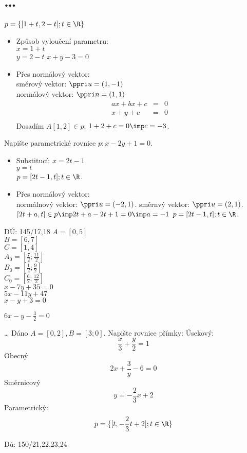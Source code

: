 
\let\braceru=\relax \let\bracelu=\relax 
\def\o#1{\setbox0=
	\hbox{$\kern2pt\overbrace{\kern-2pt#1\kern-2pt}\kern2pt$}\ht0=2.1ex\box0}
\def\to#1{\hbox{#1\rlap{\t{}}}}
\def\rad{\rm{rad}}
\def\f{\frac}
\BeginDoc{}
\section{\dots}

\Pr $p=\{[1+t,2-t];t\in\R\}$
\begin{itemize}
	\item Způsob vyloučení parametru:\\
		$x=1+t$\\
		$y=2-t$
		$x+y-3=0$
	\item Přes normálový vektor:\\
		směrový vektor: $\ppri u = (1,-1)$\\
		normálový vektor: $\ppri n = (1,1)$\\
		\begin{eqnarray*}
			ax+bx+c&=&0\\
			x+y+c &=& 0\\
		\end{eqnarray*}
		Dosadím $A[1,2]\in p$: $1+2+c=0 \imp c= -3$.
\end{itemize}
\Pr Napište parametrické rovnice $p: x-2y+1=0$.
\begin{itemize}
	\item Substitucí:
		$x = 2t -1$\\
		$y=t$\\
		$p = {[2t-1,t];t\in\R}$.
	\item Přes normálový vektor:\\
		normálnový vektor: $\ppri u = (-2,1)$.
		směrnvý vektor: $\ppri u = (2,1)$.
		$[2t+a,t]\in p \imp 2t+a-2t+1=0 \imp a=-1$ 
		$p = {[2t-1,t];t\in\R}$.
\end{itemize}
DÚ: 145/17,18
$A = [0,5]$\\
$B = [6,7]$\\
$C = [1,4]$\\
$A_0=[\f 7 2 ; \f{11}2]$\\
$B_0=[\f 1 2 ; \f{ 9}2]$\\
$C_0=[\f 6 2 ; \f{12}2]$\\
$x-7y+35=0$\\
$5x-11y+47$\\
$x-y+3=0$

$6x-y-\f32=0$


{\Huge \dots}
\Pr Dáno $A=[0,2],B=[3;0]$. Napište rovnice přímky:
Úsekový: $$ \f x 3 + \f y 2 = 1 $$ 
Obecný $$ 2 x + \f 3 y - 6 =0 $$
Směrnicový $$ y=-\f 23 x +2  $$
Parametrický: $$ p = \{ [t,-\f 23 t +2];t\in\R \}$$

Dú: 150/21,22,23,24


\EndDoc
